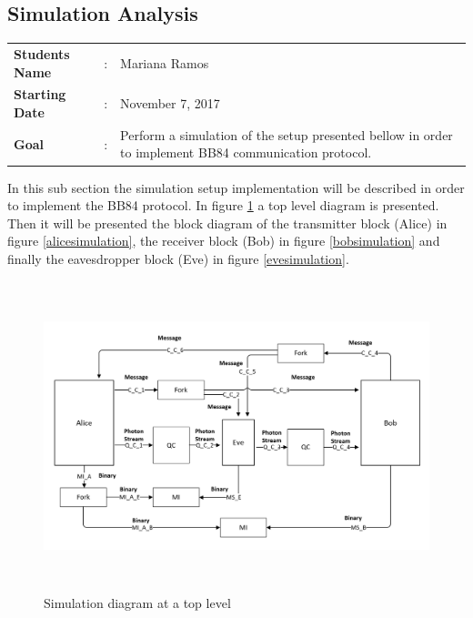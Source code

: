 \begin{enumerate}
\newpage

\subsection{Simulation Analysis}

\begin{tcolorbox}	
\begin{tabular}{p{2.75cm} p{0.2cm} p{10.5cm}} 	
\textbf{Students Name}  &:& Mariana Ramos \\
\textbf{Starting Date} &:& November 7, 2017\\
\textbf{Goal}          &:& Perform a simulation of the setup presented bellow in order to implement BB84 communication protocol.
\end{tabular}
\end{tcolorbox}

In this sub section the simulation setup implementation will be described in order to implement the BB84 protocol. In figure \ref{toplevelsimulation} a top level diagram is presented. Then it will be presented the block diagram of the transmitter block (Alice) in figure \ref{alicesimulation}, the receiver block (Bob) in figure \ref{bobsimulation} and finally the eavesdropper block (Eve) in figure \ref{evesimulation}.

\begin{figure}[H]
	\centering
	\includegraphics[width=1.0\textwidth, height=9cm]{./sdf/bb84_with_discrete_variables/figures/toplevel_simulation.png}
	\caption{Simulation diagram at a top level}\label{toplevelsimulation}
\end{figure}


\end{enumerate}
